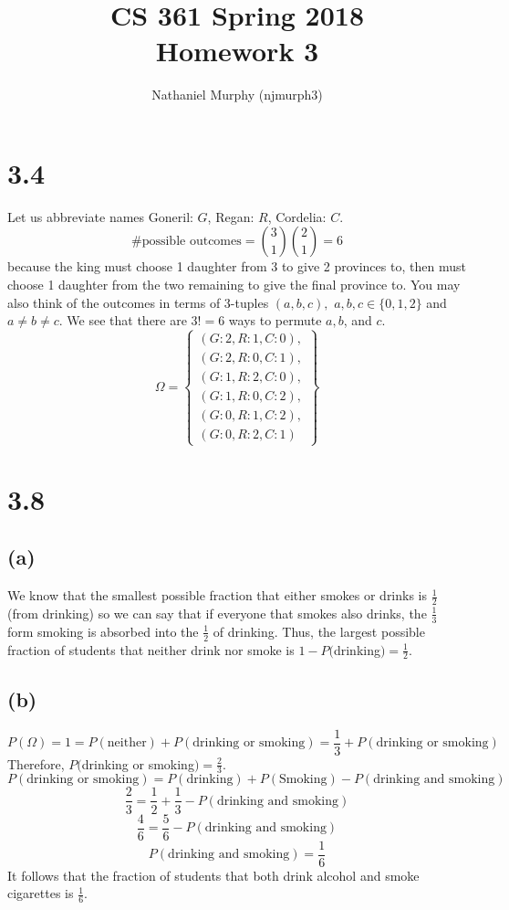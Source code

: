 \documentclass[11pt]{article}
\title{\textbf{CS 361 Spring 2018 \\ Homework 3}}
\author{Nathaniel Murphy (njmurph3)}
\begin{document}
\maketitle
\section*{3.4}
Let us abbreviate names Goneril: $G$, Regan: $R$, Cordelia: $C$.
\[\text{\# possible outcomes}=\binom{3}{1}\binom{2}{1}=6\]
because the king must choose 1 daughter from 3 to give 2 provinces to, then must choose 1 daughter from the two remaining to give the final province to. You may also think of the outcomes in terms of 3-tuples $(a,b,c),$ $a,b,c\in\{0,1,2\}$ and $a\neq b\neq c$. We see that there are $3!=6$ ways to permute $a,b$, and $c$.
\[
	\Omega=\left\{\begin{array}{l}
		(G:2,R:1,C:0), \\
		(G:2,R:0,C:1), \\
		(G:1,R:2,C:0), \\
		(G:1,R:0,C:2), \\
		(G:0,R:1,C:2), \\
		(G:0,R:2,C:1)
	\end{array}
	\right\}
\]
\section*{3.8}
\subsection*{(a)}
We know that the smallest possible fraction that either smokes or drinks is $\frac{1}{2}$ (from drinking) so we can say that if everyone that smokes also drinks, the $\frac{1}{3}$ form smoking is absorbed into the $\frac{1}{2}$ of drinking. Thus, the largest possible fraction of students that neither drink nor smoke is $1-P($drinking$)=\frac{1}{2}$.
\clearpage
\subsection*{(b)}
\[P(\Omega)=1=P(\text{neither})+P(\text{drinking or smoking})=\frac{1}{3}+P(\text{drinking or smoking})\]
Therefore, $P($drinking or smoking$)=\frac{2}{3}$.
\[P(\text{drinking or smoking})=P(\text{drinking})+P(\text{Smoking})-P(\text{drinking and smoking})\]
\[\frac{2}{3}=\frac{1}{2}+\frac{1}{3}-P(\text{drinking and smoking})\]
\[\frac{4}{6}=\frac{5}{6}-P(\text{drinking and smoking})\]
\[P(\text{drinking and smoking})=\frac{1}{6}\]
It follows that the fraction of students that both drink alcohol and smoke cigarettes is $\frac{1}{6}$.
\end{document}
